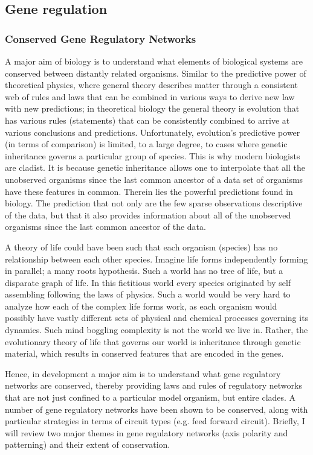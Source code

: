  

\subsection{Gene regulation}

  
\subsubsection{Conserved Gene Regulatory Networks}
	A major aim of biology is to understand what elements of biological systems are conserved between distantly related organisms.  Similar to the predictive power of theoretical physics, where general theory describes matter through a consistent web of rules and laws that can be combined in various ways to derive new law with new predictions; in theoretical biology the general theory is evolution that has various rules (statements) that can be consistently combined to arrive at various conclusions and predictions.  Unfortunately, evolution's predictive power (in terms of comparison) is limited, to a large degree, to cases where genetic inheritance governs a particular group of species.  This is why modern biologists are cladist.  It is because genetic inheritance allows one to interpolate that all the unobserved organisms since the last common ancestor of a data set of organisms have these features in common.  Therein lies the powerful predictions found in biology.  The prediction that not only are the few sparse observations descriptive of the data, but that it also provides information about all of the unobserved organisms since the last common ancestor of the data.
	
	A theory of life could have been such that each organism (species) has no relationship between each other species.  Imagine life forms independently forming in parallel; a many roots hypothesis.  Such a world has no tree of life, but a disparate graph of life. In this fictitious world every species originated by self assembling following the laws of physics.  Such a world would be very hard to analyze how each of the complex life forms work, as each organism would possibly have vastly different sets of physical and chemical processes governing its dynamics.  Such mind boggling complexity is not the world we live in.  Rather, the evolutionary theory of life that governs our world is inheritance through genetic material, which results in conserved features that are encoded in the genes.  
	
	  Hence, in development a major aim is to understand what gene regulatory networks are conserved, thereby providing laws and rules of regulatory networks that are not just confined to a particular model organism, but entire clades.  A number of gene regulatory networks have been shown to be conserved, along with particular strategies in terms of circuit types (e.g. feed forward circuit).  Briefly, I will review two major themes in gene regulatory networks (axis polarity and patterning) and their extent of conservation.
